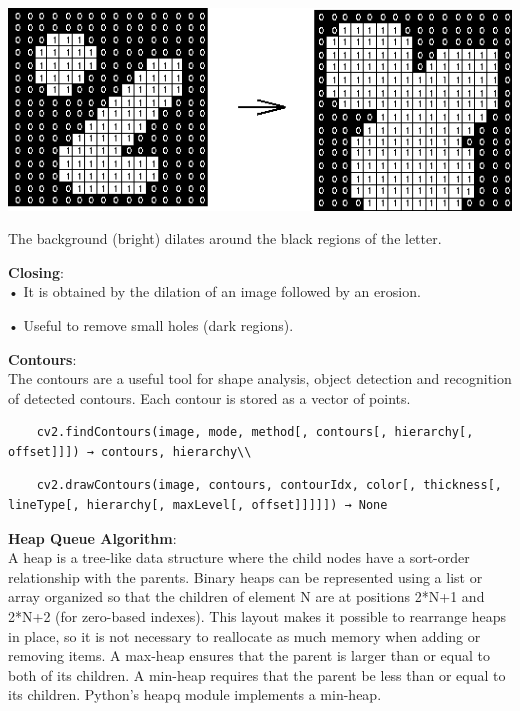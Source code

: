 \documentclass[report]{res}
\begin{document}
	\begin{center}
		\includegraphics[scale = 1]{graphics/dilation.png}
	\end{center}
	
	The background (bright) dilates around the black regions of the letter.
	
	\textbf{Closing}: \\
	•	It is obtained by the dilation of an image followed by an erosion.
	
	•	Useful to remove small holes (dark regions).
	
	
	\textbf{Contours}:\\
	The contours are a useful tool for shape analysis, object detection and recognition of detected contours. Each contour is stored as a vector of points.
	
	\begin{lstlisting}
	cv2.findContours(image, mode, method[, contours[, hierarchy[, offset]]]) → contours, hierarchy\\
	\end{lstlisting}
	
	\begin{lstlisting}
	cv2.drawContours(image, contours, contourIdx, color[, thickness[, lineType[, hierarchy[, maxLevel[, offset]]]]]) → None
	\end{lstlisting}
	
	\textbf{Heap Queue Algorithm}:\\
	A heap is a tree-like data structure where the child nodes have a sort-order relationship with the parents. Binary heaps can be represented using a list or array organized so that the children of element N are at positions 2*N+1 and 2*N+2 (for zero-based indexes). This layout makes it possible to rearrange heaps in place, so it is not necessary to reallocate as much memory when adding or removing items.
	A max-heap ensures that the parent is larger than or equal to both of its children. A min-heap requires that the parent be less than or equal to its children. Python’s heapq module implements a min-heap.\\
	
\end{document}
